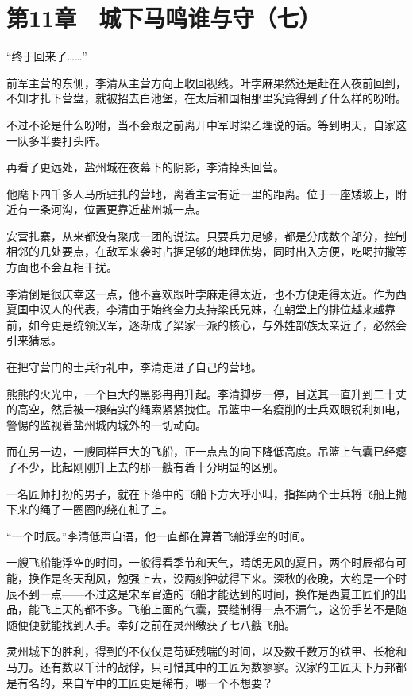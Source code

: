 \section{第11章　城下马鸣谁与守（七）}

“终于回来了……”

前军主营的东侧，李清从主营方向上收回视线。叶孛麻果然还是赶在入夜前回到，不知才扎下营盘，就被招去白池堡，在太后和国相那里究竟得到了什么样的吩咐。

不过不论是什么吩咐，当不会跟之前离开中军时梁乙埋说的话。等到明天，自家这一队多半要打头阵。

再看了更远处，盐州城在夜幕下的阴影，李清掉头回营。

他麾下四千多人马所驻扎的营地，离着主营有近一里的距离。位于一座矮坡上，附近有一条河沟，位置更靠近盐州城一点。

安营扎寨，从来都没有聚成一团的说法。只要兵力足够，都是分成数个部分，控制相邻的几处要点，在敌军来袭时占据足够的地理优势，同时出入方便，吃喝拉撒等方面也不会互相干扰。

李清倒是很庆幸这一点，他不喜欢跟叶孛麻走得太近，也不方便走得太近。作为西夏国中汉人的代表，李清由于始终全力支持梁氏兄妹，在朝堂上的排位越来越靠前，如今更是统领汉军，逐渐成了梁家一派的核心，与外姓部族太亲近了，必然会引来猜忌。

在把守营门的士兵行礼中，李清走进了自己的营地。

熊熊的火光中，一个巨大的黑影冉冉升起。李清脚步一停，目送其一直升到二十丈的高空，然后被一根结实的绳索紧紧拽住。吊篮中一名瘦削的士兵双眼锐利如电，警惕的监视着盐州城内城外的一切动向。

而在另一边，一艘同样巨大的飞船，正一点点的向下降低高度。吊篮上气囊已经瘪了不少，比起刚刚升上去的那一艘有着十分明显的区别。

一名匠师打扮的男子，就在下落中的飞船下方大呼小叫，指挥两个士兵将飞船上抛下来的绳子一圈圈的绕在桩子上。

“一个时辰。”李清低声自语，他一直都在算着飞船浮空的时间。

一艘飞船能浮空的时间，一般得看季节和天气，晴朗无风的夏日，两个时辰都有可能，换作是冬天刮风，勉强上去，没两刻钟就得下来。深秋的夜晚，大约是一个时辰不到一点——不过这是宋军官造的飞船才能达到的时间，换作是西夏工匠们的出品，能飞上天的都不多。飞船上面的气囊，要缝制得一点不漏气，这份手艺不是随随便便就能找到人手。幸好之前在灵州缴获了七八艘飞船。

灵州城下的胜利，得到的不仅仅是苟延残喘的时间，以及数千数万的铁甲、长枪和马刀。还有数以千计的战俘，只可惜其中的工匠为数寥寥。汉家的工匠天下万邦都是有名的，来自军中的工匠更是稀有，哪一个不想要？

